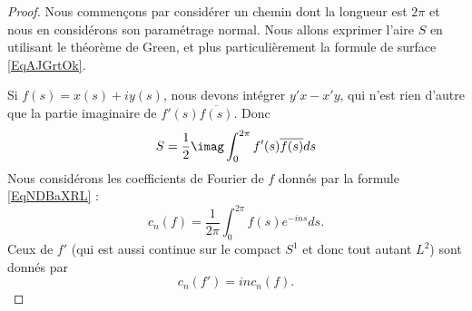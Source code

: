 \begin{proof}
	Nous commençons par considérer un chemin dont la longueur est \( 2\pi\) et nous en considérons son paramétrage normal. Nous allons exprimer l'aire \( S\) en utilisant le théorème de Green, et plus particulièrement la formule de surface \eqref{EqAJGrtOk}.

	Si \( f(s)=x(s)+iy(s)\), nous devons intégrer \( y'x-x'y\), qui n'est rien d'autre que la partie imaginaire de \( f'(s)\overline{ f(s) }\). Donc
	\begin{equation}    \label{EqCSWKbPX}
		S=\frac{ 1 }{2}\imag\int_0^{2\pi}f'(s)\overline{ f(s) }ds
	\end{equation}
	Nous considérons les coefficients de Fourier de \( f\) donnés par la formule \eqref{EqNDBaXRL} :
	\begin{equation}
		c_n(f)=\frac{1}{ 2\pi }\int_0^{2\pi}f(s) e^{-ins}ds.
	\end{equation}
	Ceux de \( f'\) (qui est aussi continue sur le compact \( S^1\) et donc tout autant \( L^2\)) sont donnés par
	\begin{equation}
		c_n(f')=inc_n(f).
	\end{equation}


\end{proof}
